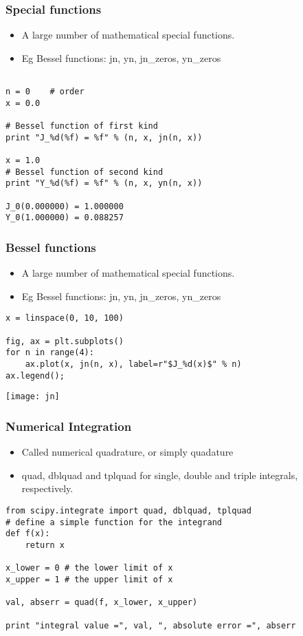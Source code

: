 \begin{frame}[fragile]\frametitle{Special functions}
 \begin{itemize}
  \item A large number of mathematical special functions. 
  \item Eg Bessel functions: jn, yn, jn\_zeros, yn\_zeros
 \end{itemize}
\begin{lstlisting}

n = 0    # order
x = 0.0

# Bessel function of first kind
print "J_%d(%f) = %f" % (n, x, jn(n, x))

x = 1.0
# Bessel function of second kind
print "Y_%d(%f) = %f" % (n, x, yn(n, x))

J_0(0.000000) = 1.000000
Y_0(1.000000) = 0.088257
\end{lstlisting}
\end{frame}



\begin{frame}[fragile]\frametitle{Bessel functions}
 \begin{itemize}
  \item A large number of mathematical special functions. 
  \item Eg Bessel functions: jn, yn, jn\_zeros, yn\_zeros
 \end{itemize}
\begin{lstlisting}
x = linspace(0, 10, 100)

fig, ax = plt.subplots()
for n in range(4):
    ax.plot(x, jn(n, x), label=r"$J_%d(x)$" % n)
ax.legend();
\end{lstlisting}
\begin{center}
\texttt{[image: jn]}
\end{center}
\end{frame}

\begin{frame}[fragile]\frametitle{Numerical Integration}
 \begin{itemize}
  \item  Called numerical quadrature, or simply quadature
  \item quad, dblquad and tplquad for single, double and triple integrals, respectively.
 \end{itemize}
\begin{lstlisting}
from scipy.integrate import quad, dblquad, tplquad
# define a simple function for the integrand
def f(x):
    return x
    
x_lower = 0 # the lower limit of x
x_upper = 1 # the upper limit of x

val, abserr = quad(f, x_lower, x_upper)

print "integral value =", val, ", absolute error =", abserr    
\end{lstlisting}

\end{frame}

